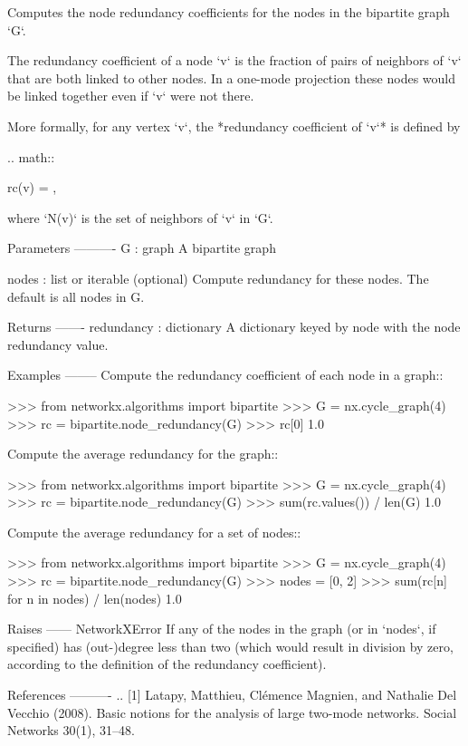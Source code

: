 \begin{DoxyVerb}Computes the node redundancy coefficients for the nodes in the bipartite
graph `G`.

The redundancy coefficient of a node `v` is the fraction of pairs of
neighbors of `v` that are both linked to other nodes. In a one-mode
projection these nodes would be linked together even if `v` were
not there.

More formally, for any vertex `v`, the *redundancy coefficient of `v`* is
defined by

.. math::

    rc(v) = ,

where `N(v)` is the set of neighbors of `v` in `G`.

Parameters
----------
G : graph
    A bipartite graph

nodes : list or iterable (optional)
    Compute redundancy for these nodes. The default is all nodes in G.

Returns
-------
redundancy : dictionary
    A dictionary keyed by node with the node redundancy value.

Examples
--------
Compute the redundancy coefficient of each node in a graph::

    >>> from networkx.algorithms import bipartite
    >>> G = nx.cycle_graph(4)
    >>> rc = bipartite.node_redundancy(G)
    >>> rc[0]
    1.0

Compute the average redundancy for the graph::

    >>> from networkx.algorithms import bipartite
    >>> G = nx.cycle_graph(4)
    >>> rc = bipartite.node_redundancy(G)
    >>> sum(rc.values()) / len(G)
    1.0

Compute the average redundancy for a set of nodes::

    >>> from networkx.algorithms import bipartite
    >>> G = nx.cycle_graph(4)
    >>> rc = bipartite.node_redundancy(G)
    >>> nodes = [0, 2]
    >>> sum(rc[n] for n in nodes) / len(nodes)
    1.0

Raises
------
NetworkXError
    If any of the nodes in the graph (or in `nodes`, if specified) has
    (out-)degree less than two (which would result in division by zero,
    according to the definition of the redundancy coefficient).

References
----------
.. [1] Latapy, Matthieu, Clémence Magnien, and Nathalie Del Vecchio (2008).
   Basic notions for the analysis of large two-mode networks.
   Social Networks 30(1), 31--48.\end{DoxyVerb}
 